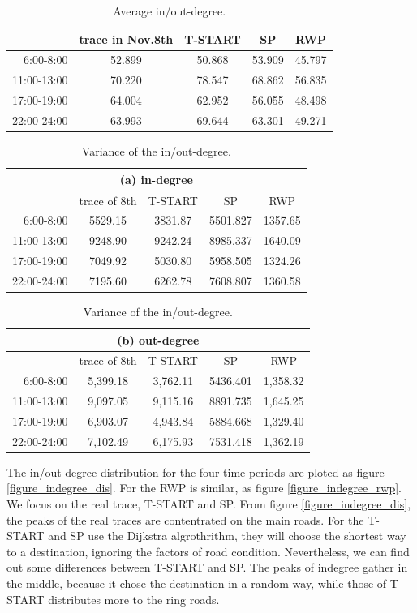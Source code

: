 \begin{table}[!h]
\caption{Average in/out-degree.}\label{table_avg_inoutdegree}
\centering
\begin{tabular}{r|c|c|c|c}
\hline
	&trace in Nov.8th	&T-START &SP &RWP\\
\hline
6:00-8:00&
52.899&50.868&53.909&45.797\\
11:00-13:00&
70.220&78.547&68.862&56.835\\  
17:00-19:00&
64.004&62.952&56.055&48.498\\
22:00-24:00&
63.993&69.644&63.301&49.271\\	
\hline
\end{tabular}
\end{table}

\begin{table}[!h]
\caption{Variance of the in/out-degree.}\label{table_variance}
\centering
\begin{tabular}{r|c|c|c|c}
\multicolumn{5}{c}{(a) in-degree}\\
\hline
	&trace of 8th	&T-START &SP &RWP\\
\hline
 6:00-8:00	&
5529.15&	3831.87&5501.827&	1357.65\\ 
 11:00-13:00&
9248.90&	9242.24&	8985.337&	1640.09\\
 17:00-19:00&
7049.92&	5030.80&	5958.505&	1324.26\\
 22:00-24:00&
7195.60&	6262.78&	7608.807&	1360.58\\
\hline
\end{tabular}
\begin{tabular}{r|c|c|c|c}
\hline
\multicolumn{5}{c}{(b) out-degree}\\
\hline
	&trace of 8th	&T-START &SP &RWP\\
\hline
 6:00-8:00	&
5,399.18&3,762.11&5436.401&1,358.32\\
 11:00-13:00&
9,097.05&9,115.16&8891.735&1,645.25\\
 17:00-19:00&
6,903.07&4,943.84&5884.668&1,329.40\\
 22:00-24:00&
7,102.49&6,175.93&7531.418&1,362.19\\
\hline
\end{tabular}
\end{table}
The in/out-degree distribution for the four time periods are ploted as figure \ref{figure_indegree_dis}.
For the RWP is similar, as figure \ref{figure_indegree_rwp}. We focus on the real trace, T-START and SP.  
From figure \ref{figure_indegree_dis}, the peaks of the real traces are contentrated on the main roads. For the T-START and SP use the Dijkstra algrothrithm, they will choose the shortest way to a destination, ignoring the factors of road condition. Nevertheless, we can find out some differences between T-START and SP. The peaks of indegree gather in the middle, because it chose the destination in a random way, while those of T-START distributes more to the ring roads.
